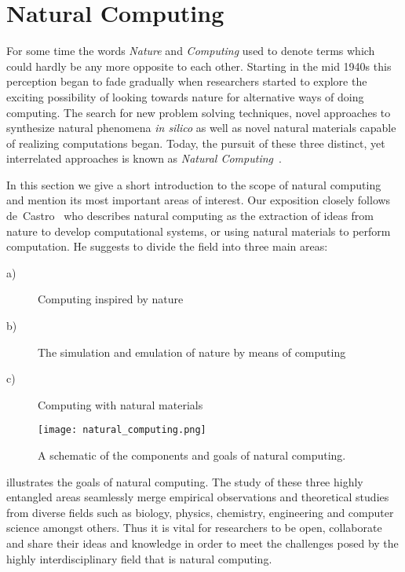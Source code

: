 \section{Natural Computing}

	For some time the words \emph{Nature} and \emph{Computing} used to denote terms which could hardly be any more opposite to each other. Starting in the mid 1940s this perception began to fade gradually when researchers started to explore the exciting possibility of looking towards nature for alternative ways of doing computing. The search for new problem solving techniques, novel approaches to synthesize natural phenomena \emph{in silico} as well as novel natural materials capable of realizing computations began. Today, the pursuit of these three distinct, yet interrelated approaches is known as \emph{Natural Computing}~\cite{de2005natural,de2006fundamentals}.

	In this section we give a short introduction to the scope of natural computing and mention its most important areas of interest. Our exposition closely follows de~Castro~\cite{de2007fundamentals} who describes natural computing as the extraction of ideas from nature to develop computational systems, or using natural materials to perform computation. He suggests to divide the field into three main areas:

	\begin{description}
		\item[a)] Computing inspired by nature
		\item[b)] The simulation and emulation of nature by means of computing
		\item[c)] Computing with natural materials
	\end{description}

	\begin{figure}
			\centering
			\texttt{[image: natural\_computing.png]}
			\caption[The goals of natural computing.]{A schematic of the components and goals of natural computing.}
			\label{fig:natural_computing}
	\end{figure}

	 illustrates the goals of natural computing. The study of these three highly entangled areas seamlessly merge empirical observations and theoretical studies from diverse fields such as biology, physics, chemistry, engineering and computer science amongst others. Thus it is vital for researchers to be open, collaborate and share their ideas and knowledge in order to meet the challenges posed by the highly interdisciplinary field that is natural computing.

